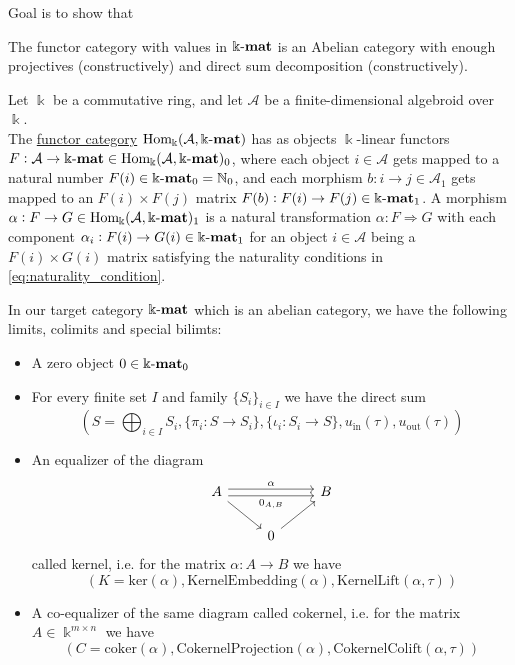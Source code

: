 \label{sect:abelian_cat}
Goal is to show that

The functor category with values in $\Bbbk\textnormal{-}\mathbf{mat}$ is an Abelian category with enough projectives (constructively) and direct sum decomposition (constructively).


\begin{definition}
Let $\Bbbk$ be a commutative ring, and let $\mathcal{A}$ be a finite-dimensional algebroid over $\Bbbk$.\\
The \ul{functor category} $\mathrm{Hom_{\Bbbk}}(\mathcal{A},\Bbbk\textnormal{-}\mathbf{mat})$ has as objects $\Bbbk$-linear functors $F : \mathcal{A} \rightarrow \Bbbk\textnormal{-}\mathbf{mat} \in \mathrm{Hom_{\Bbbk}}(\mathcal{A},\Bbbk\textnormal{-}\mathbf{mat})_{0}$, where each
object $i \in \mathcal{A}$ gets mapped to a natural number $F(i) \in \Bbbk\textnormal{-}\mathbf{mat}_{0} = \mathbb{N}_{0}$, and each
morphism $b : i \rightarrow j \in \mathcal{A}_{1}$ gets mapped to an $F(i) \times F(j)$ matrix $F(b) : F(i) \rightarrow F(j) \in \Bbbk\textnormal{-}\mathbf{mat}_{1}$.
A morphism $\alpha : F \rightarrow G \in \mathrm{Hom_{\Bbbk}}(\mathcal{A},\Bbbk\textnormal{-}\mathbf{mat})_{1}$ is a natural transformation $\alpha : F \Rightarrow G$ with each component
$\alpha_{i} : F(i) \rightarrow G(i) \in \Bbbk\textnormal{-}\mathbf{mat}_{1}$ for an object $i \in \mathcal{A}$ being a $F(i) \times G(i)$ matrix satisfying the
naturality conditions in \eqref{eq:naturality_condition}.
\end{definition}

\begin{example}
In our target category $\Bbbk\textnormal{-}\mathbf{mat}$ which is an abelian category, we have the following limits, colimits and special bilimts:
\begin{itemize}
\item A zero object $0 \in \Bbbk\textnormal{-}\mathbf{mat}_{0}$
\item For every finite set $I$ and family $\{S_{i}\}_{i \in I}$ we have the direct sum
\[
(S = \bigoplus_{i\in I} S_{i}, \{\pi_{i} : S \rightarrow S_{i}\}, \{\iota_{i} : S_{i} \rightarrow S\}, u_{\text{in}}(\tau), u_{\text{out}}(\tau))
\]
\item An equalizer of the diagram 
\[
\begin{tikzcd}
A \arrow[rr, "{0_{A,B}}"', shift right] \arrow[rd] \arrow[rr, "\alpha", shift left] &              & B \\
                                                                               & 0 \arrow[ru] &  
\end{tikzcd}
\]
called kernel, i.e. for the matrix $\alpha : A \rightarrow B$ we have
\[
(K = \mathrm{ker}(\alpha), \mathrm{KernelEmbedding}(\alpha), \mathrm{KernelLift}(\alpha,\tau))
\]

\item A co-equalizer of the same diagram called cokernel, i.e. for the matrix $A \in \Bbbk^{m\times n}$ we have
\[
(C = \mathrm{coker}(\alpha), \mathrm{CokernelProjection}(\alpha), \mathrm{CokernelColift}(\alpha,\tau))
\]



\end{itemize}
\end{example}

